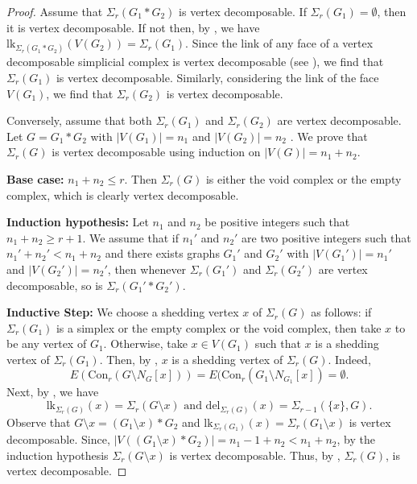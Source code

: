\documentclass[12pt,reqno]{amsart}
\theoremstyle{definition}
\newcommand{\lk}{{\mathrm{lk}}}
\newcommand{\del}{{\mathrm{del}}}
\newcommand{\Con}{{\mathrm{Con}}}
\def\del{\mathrm{del}}
\begin{document}
	\begin{proof}
		Assume that $\Sigma_r(G_1*G_2)$ is vertex decomposable. If $\Sigma_r(G_1) = \emptyset$, then it is vertex decomposable. If not then, by , we have $\lk_{\Sigma_r(G_1*G_2)}(V(G_2))=\Sigma_r(G_1)$. Since the link of any face of a vertex decomposable simplicial complex is vertex decomposable (see \cite[Proposition 2.3]{ProBill1980}), we find that $\Sigma_r(G_1)$ is vertex decomposable. Similarly, considering the link of the face $V(G_1)$, we find that $\Sigma_r(G_2)$ is vertex decomposable.
		
		Conversely, assume that both $\Sigma_r(G_1)$ and $\Sigma_r(G_2)$ are vertex decomposable. Let $G=G_1*G_2$ with $|V(G_1)|=n_1$ and $|V(G_2)| = n_2$ . We prove that $\Sigma_r(G)$ is vertex decomposable using induction on $|V(G)|=n_1+n_2$.
        
			\medskip
			\noindent
			\textbf{Base case:} $n_1+n_2 \le r$. Then $\Sigma_r(G)$ is either the void complex or the empty complex, which is clearly vertex decomposable.
			
            \medskip
			\noindent
			\textbf{Induction hypothesis:} Let $n_1$ and $n_2$ be positive integers such that $n_1 + n_2 \ge r+1$. We assume that if $n_1'$ and $n_2'$ are two positive integers such that $n_1' + n_2' < n_1 + n_2$ and there exists graphs $G_1'$ and $G_2'$ with $|V(G_1')| = n_1'$ and $|V(G_2')| = n_2'$, then whenever $\Sigma_r(G_1')$ and $\Sigma_r(G_2')$ are vertex decomposable, so is $\Sigma_r(G_1' * G_2')$.
			
            \medskip
			\noindent
			\textbf{Inductive Step:} We choose a shedding vertex $x$ of $\Sigma_r(G)$ as follows: if $\Sigma_r(G_1)$ is a simplex or the empty complex or the void complex, then take $x$ to be any vertex of $G_1$. Otherwise, take $x\in V(G_1)$ such that $x$ is a shedding vertex of $\Sigma_r(G_1)$. Then, by , $x$ is a shedding vertex of $\Sigma_r(G)$. Indeed,
            \[E(\Con_r(G\setminus N_G[x])) = E(\Con_r(G_1 \setminus N_{G_1}[x]) = \emptyset.\]
            Next, by , we have
		\[
		\lk_{\Sigma_r(G)}(x) = \Sigma_r(G \setminus x) \text{  and  }\del_{\Sigma_r(G)}(x) = \Sigma_{r-1}(\{x\},G).
		\]
Observe that $ G\setminus x = (G_1 \setminus x)*G_2$ and $\lk_{\Sigma_r(G_1)}(x) = \Sigma_r(G_1 \setminus x)$ is vertex decomposable. Since, $|V((G_1\setminus x)*G_2)| = n_1-1+n_2 < n_1 + n_2$, by the induction hypothesis $\Sigma_r(G\setminus x)$ is vertex decomposable. Thus, by , $\Sigma_r(G)$, is vertex decomposable.
            \end{proof}
\end{document}
